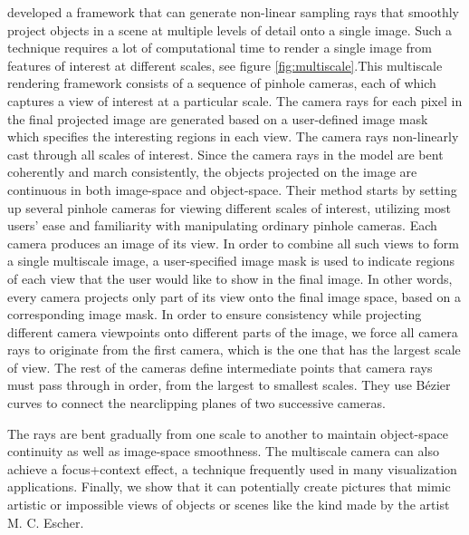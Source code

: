  \cite{Hsu:2011:RFM:2070781.2024165} developed a framework that can generate non-linear sampling rays that smoothly project objects in a scene at multiple levels of detail onto a single image. Such a technique requires a lot of computational time to render a single image from features of interest at different scales, see figure \ref{fig:multiscale}.This  multiscale rendering framework consists of a sequence of pinhole cameras, each of which captures a view of interest at a particular scale. The camera rays for each pixel in the final projected image are generated based on a user-defined image mask which specifies the interesting regions in each view.  The camera rays non-linearly cast through all scales of interest. Since the camera rays in the model are bent coherently and march consistently, the objects projected on the image are continuous in both image-space and object-space. 
 Their method starts by setting up several pinhole cameras for viewing different scales of interest, utilizing most users’ ease and familiarity with manipulating ordinary pinhole cameras. Each camera produces an image of its view. In order to combine all such views to form a single multiscale image, a user-specified image mask is used to indicate regions of each view that the user would like to show in the final image. In other words, every camera projects only part of its view onto the final image space, based on a corresponding image mask. In order to ensure consistency while projecting different camera
viewpoints onto different parts of the image, we force all camera rays to originate from the first camera, which is the one that has the largest scale of view. The rest of the cameras define intermediate
points that camera rays must pass through in order, from the largest to smallest scales. They use B\'ezier curves to connect the nearclipping planes of two successive cameras.

  The rays are bent gradually from one scale to another to maintain object-space continuity as well as image-space smoothness. The multiscale camera can also achieve a focus+context effect, a technique frequently used in many visualization applications. Finally, we show that it can potentially create pictures that mimic artistic or impossible views of objects or scenes like the kind made by the artist M. C. Escher. 
 
